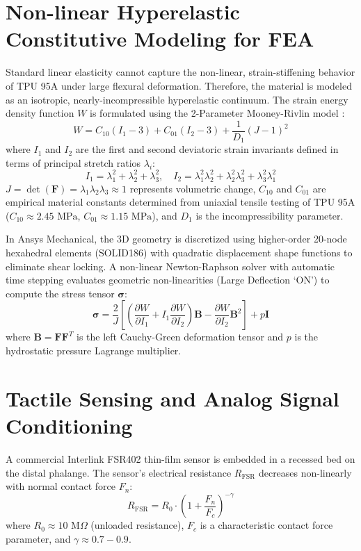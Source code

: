 \documentclass[12pt,a4paper]{report}
\begin{document}
\section{Non-linear Hyperelastic Constitutive Modeling for FEA}
Standard linear elasticity cannot capture the non-linear, strain-stiffening behavior of TPU 95A under large flexural deformation. Therefore, the material is modeled as an isotropic, nearly-incompressible hyperelastic continuum. The strain energy density function $W$ is formulated using the 2-Parameter Mooney-Rivlin model \cite{mooney1940theory}:
\begin{equation}
    W = C_{10}(I_1 - 3) + C_{01}(I_2 - 3) + \frac{1}{D_1}(J - 1)^2
\end{equation}
where $I_1$ and $I_2$ are the first and second deviatoric strain invariants defined in terms of principal stretch ratios $\lambda_i$:
\begin{equation}
    I_1 = \lambda_1^2 + \lambda_2^2 + \lambda_3^2, \quad I_2 = \lambda_1^2 \lambda_2^2 + \lambda_2^2 \lambda_3^2 + \lambda_3^2 \lambda_1^2
\end{equation}
$J = \det(\mathbf{F}) = \lambda_1 \lambda_2 \lambda_3 \approx 1$ represents volumetric change, $C_{10}$ and $C_{01}$ are empirical material constants determined from uniaxial tensile testing of TPU 95A ($C_{10} \approx 2.45\text{ MPa}$, $C_{01} \approx 1.15\text{ MPa}$), and $D_1$ is the incompressibility parameter.

In Ansys Mechanical, the 3D geometry is discretized using higher-order 20-node hexahedral elements (SOLID186) with quadratic displacement shape functions to eliminate shear locking. A non-linear Newton-Raphson solver with automatic time stepping evaluates geometric non-linearities (Large Deflection `ON') to compute the stress tensor $\mathbf{\sigma}$:
\begin{equation}
    \mathbf{\sigma} = \frac{2}{J} \left[ \left(\frac{\partial W}{\partial I_1} + I_1 \frac{\partial W}{\partial I_2}\right) \mathbf{B} - \frac{\partial W}{\partial I_2} \mathbf{B}^2 \right] + p \mathbf{I}
\end{equation}
where $\mathbf{B} = \mathbf{F} \mathbf{F}^T$ is the left Cauchy-Green deformation tensor and $p$ is the hydrostatic pressure Lagrange multiplier.

\section{Tactile Sensing and Analog Signal Conditioning}
A commercial Interlink FSR402 thin-film sensor is embedded in a recessed bed on the distal phalange. The sensor's electrical resistance $R_{\text{FSR}}$ decreases non-linearly with normal contact force $F_n$:
\begin{equation}
    R_{\text{FSR}} = R_0 \cdot \left(1 + \frac{F_n}{F_c}\right)^{-\gamma}
\end{equation}
where $R_0 \approx 10\text{ M}\Omega$ (unloaded resistance), $F_c$ is a characteristic contact force parameter, and $\gamma \approx 0.7 - 0.9$.
\end{document}
